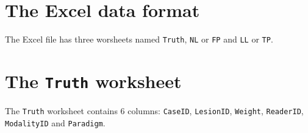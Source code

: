 \documentclass[]{book}
\begin{document}
\hypertarget{the-excel-data-format-3}{%
\section{The Excel data format}\label{the-excel-data-format-3}}

The Excel file has three worsheets named \texttt{Truth}, \texttt{NL} or \texttt{FP} and \texttt{LL} or \texttt{TP}.

\hypertarget{the-truth-worksheet-3}{%
\section{\texorpdfstring{The \texttt{Truth} worksheet}{The Truth worksheet}}\label{the-truth-worksheet-3}}

The \texttt{Truth} worksheet contains 6 columns: \texttt{CaseID}, \texttt{LesionID}, \texttt{Weight}, \texttt{ReaderID}, \texttt{ModalityID} and \texttt{Paradigm}.
\end{document}
